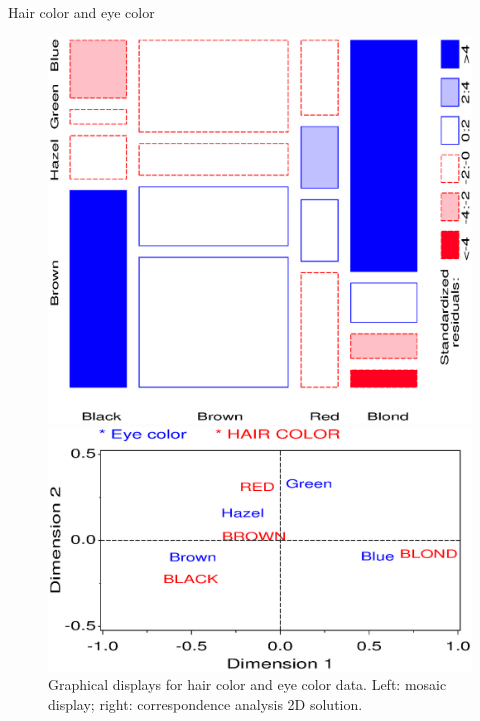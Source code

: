 \begin{Example}[haireye0]{Hair color and eye color}
\begin{figure}[htb]
 \begin{minipage}[c]{.49\linewidth}
  \includegraphics[width=1\linewidth,clip]{ch4/fig/mosaic34}
 \end{minipage}%
 \hfill
 \begin{minipage}[c]{.49\linewidth}
  \includegraphics[width=1\linewidth,clip]{ch5/fig/corresp3}
 \end{minipage}
 \caption[Graphical displays for hair color and eye color data]{Graphical displays for hair color and eye color data. Left: mosaic display; right:  correspondence analysis 2D solution.}\label{fig:haireye0}
\end{figure}


\end{Example}
